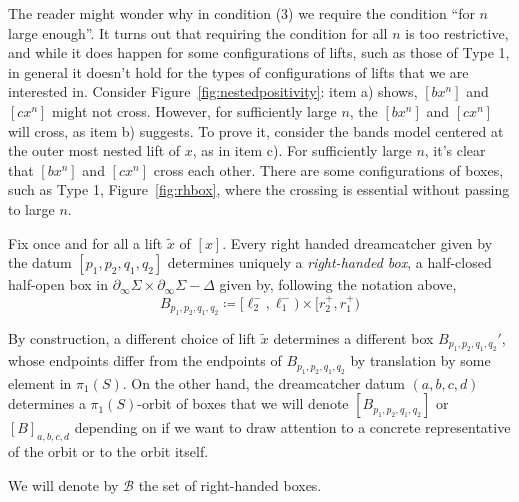 \begin{remark}
The reader might wonder why in condition (3) we require the condition
  ``for $n$ large enough''. It turns out that requiring the condition
  for all $n$ is too restrictive, and while it does happen for some
  configurations of lifts, such as those of Type 1,
  in general it doesn't hold for the types of configurations of lifts
  that we are interested in. 
 Consider Figure~\ref{fig:nestedpositivity}: item a) shows, $[bx^n]$ and $[cx^n]$ might not cross. However, for sufficiently large $n$, the $[b x^n]$ and $[c x^n]$ will cross, as item b) suggests. To prove it, consider the bands model centered at the outer most nested lift of $x$, as in item c). For sufficiently large $n$, it's clear that $[b x^n]$ and $[c x^n]$ cross each other.
 There are some configurations of boxes, such as Type 1, Figure~\ref{fig:rhbox}, where the crossing is essential without passing to large $n$.
\label{rmk:largeenough}
\end{remark}

\begin{definition}\label{def:dreamcatcher-box}
Fix once and for all a lift $\tilde{x}$ of $[x]$. Every right handed dreamcatcher given by the datum $[p_1,p_2,q_1,q_2]$  determines uniquely a \emph{right-handed box}, a half-closed half-open box in $\partial_{\infty} \Sigma \times \partial_{\infty} \Sigma - \Delta$ given by, following the notation above,
\[
B_{p_1,p_2,q_1,q_2} \coloneqq [\ell_2^-,\ell_1^-) \times [r_2^+,r_1^+)
\]

By construction, a different choice of lift $\tilde{x}$ determines a different box $B_{p_1,p_2,q_1,q_2}'$, whose endpoints differ from the endpoints of $B_{p_1,p_2,q_1,q_2}$ by translation by some element in $\pi_1(S)$.
On the other hand, the dreamcatcher datum $(a,b,c,d)$
determines a $\pi_1(S)$-orbit of boxes that we will denote
$[B_{p_1,p_2,q_1,q_2}]$ or $[B]_{a,b,c,d}$ depending on if we want to
draw attention to a concrete representative of the orbit or to the
orbit itself. 

We will denote by $\mathcal{B}$ the set of right-handed boxes.
\end{definition}



